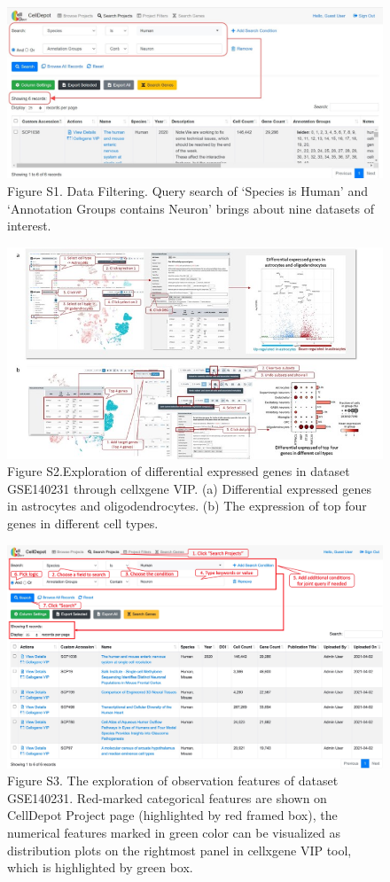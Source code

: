 \documentclass[
]{book}
\begin{document}
\begin{figure}
\centering
\includegraphics{figures/S1.jpg}
\caption{Figure S1. Data Filtering. Query search of `Species is Human' and `Annotation Groups contains Neuron' brings about nine datasets of interest.}
\end{figure}

\begin{figure}
\centering
\includegraphics{figures/S2.jpg}
\caption{Figure S2.Exploration of differential expressed genes in dataset GSE140231 through cellxgene VIP. (a) Differential expressed genes in astrocytes and oligodendrocytes. (b) The expression of top four genes in different cell types.}
\end{figure}

\begin{figure}
\centering
\includegraphics{figures/S3.jpg}
\caption{Figure S3. The exploration of observation features of dataset GSE140231. Red-marked categorical features are shown on CellDepot Project page (highlighted by red framed box), the numerical features marked in green color can be visualized as distribution plots on the rightmost panel in cellxgene VIP tool, which is highlighted by green box.}
\end{figure}
\end{document}
